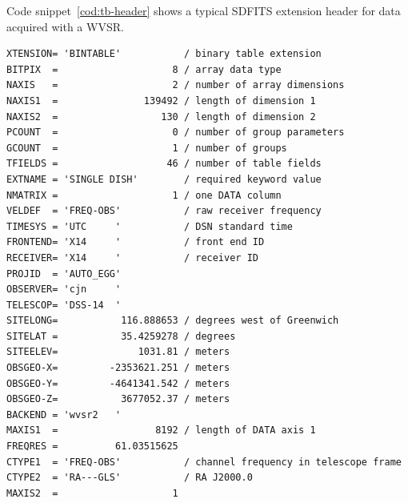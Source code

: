 \documentclass[letterpaper,11pt]{book}
\begin{document}
Code snippet~\ref{cod:tb-header} shows a typical SDFITS extension header for
data acquired with a WVSR.
\begin{code}[h!]
\begin{center}
{\scriptsize \begin{verbatim}
XTENSION= 'BINTABLE'           / binary table extension                         
BITPIX  =                    8 / array data type                                
NAXIS   =                    2 / number of array dimensions                     
NAXIS1  =               139492 / length of dimension 1                          
NAXIS2  =                  130 / length of dimension 2                          
PCOUNT  =                    0 / number of group parameters                     
GCOUNT  =                    1 / number of groups                               
TFIELDS =                   46 / number of table fields                         
EXTNAME = 'SINGLE DISH'        / required keyword value                         
NMATRIX =                    1 / one DATA column                                
VELDEF  = 'FREQ-OBS'           / raw receiver frequency                         
TIMESYS = 'UTC     '           / DSN standard time                              
FRONTEND= 'X14     '           / front end ID                                   
RECEIVER= 'X14     '           / receiver ID                                    
PROJID  = 'AUTO_EGG'                                                            
OBSERVER= 'cjn     '                                                            
TELESCOP= 'DSS-14  '                                                            
SITELONG=           116.888653 / degrees west of Greenwich                      
SITELAT =           35.4259278 / degrees                                        
SITEELEV=              1031.81 / meters                                         
OBSGEO-X=         -2353621.251 / meters                                         
OBSGEO-Y=         -4641341.542 / meters                                         
OBSGEO-Z=           3677052.37 / meters                                         
BACKEND = 'wvsr2   '                                                            
MAXIS1  =                 8192 / length of DATA axis 1                          
FREQRES =          61.03515625                                                  
CTYPE1  = 'FREQ-OBS'           / channel frequency in telescope frame           
CTYPE2  = 'RA---GLS'           / RA J2000.0                                     
MAXIS2  =                    1                                                  

\end{verbatim}}
\end{center}
\end{code}
\end{document}
